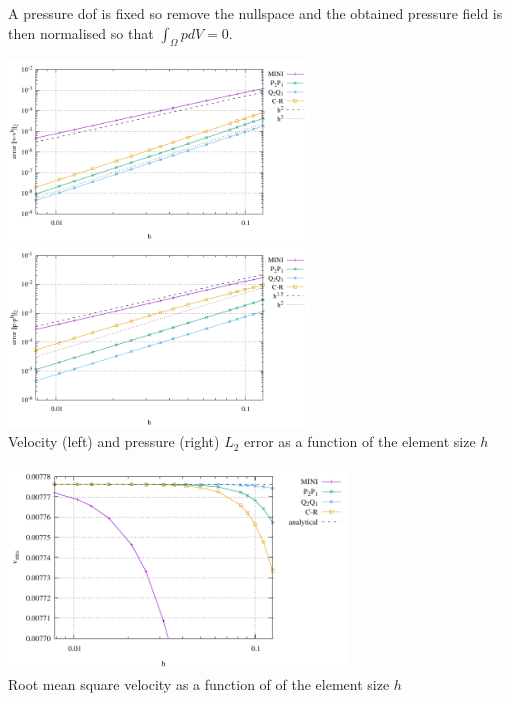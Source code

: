 A pressure dof is fixed so remove the nullspace and the obtained pressure field
is then normalised so that $\int_\Omega p dV = 0$.

\begin{center}
\includegraphics[width=8cm]{python_codes/fieldstone_112/results/errors_V.pdf}
\includegraphics[width=8cm]{python_codes/fieldstone_112/results/errors_P.pdf}\\
{\captionfont Velocity (left) and pressure (right) $L_2$ error as a function of the element size $h$}
\end{center}

\begin{center}
\includegraphics[width=9cm]{python_codes/fieldstone_112/results/vrms.pdf}\\
{\captionfont Root mean square velocity as a function of of the element size $h$}
\end{center}

